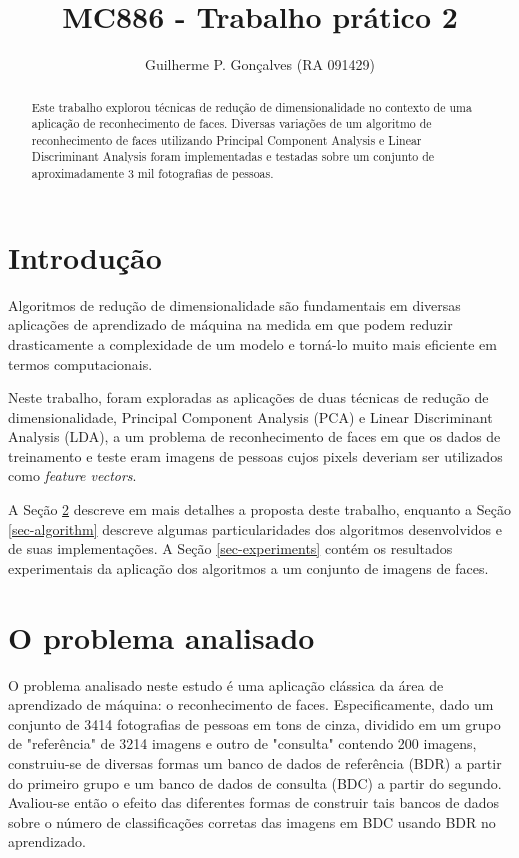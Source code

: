 \documentclass[10pt,twocolumn,letterpaper]{article}
\begin{document}
\title{MC886 - Trabalho prático 2}
\author{Guilherme P. Gonçalves (RA 091429)}

\maketitle
\begin{abstract}
Este trabalho explorou técnicas de redução de dimensionalidade no contexto de uma aplicação de reconhecimento de faces. Diversas variações de um algoritmo de reconhecimento de faces utilizando Principal Component Analysis e Linear Discriminant Analysis foram implementadas e testadas sobre um conjunto de aproximadamente 3 mil fotografias de pessoas.
\end{abstract}

\section{Introdução}

Algoritmos de redução de dimensionalidade são fundamentais em diversas aplicações de aprendizado de máquina na medida em que podem reduzir drasticamente a complexidade de um modelo e torná-lo muito mais eficiente em termos computacionais.

Neste trabalho, foram exploradas as aplicações de duas técnicas de redução de dimensionalidade, Principal Component Analysis (PCA) e Linear Discriminant Analysis (LDA), a um problema de reconhecimento de faces em que os dados de treinamento e teste eram imagens de pessoas cujos pixels deveriam ser utilizados como \emph{feature vectors}.

A Seção \ref{sec-problem} descreve em mais detalhes a proposta deste trabalho, enquanto a Seção \ref{sec-algorithm} descreve algumas particularidades dos algoritmos desenvolvidos e de suas implementações. A Seção \ref{sec-experiments} contém os resultados experimentais da aplicação dos algoritmos a um conjunto de imagens de faces.

\section{O problema analisado}
\label{sec-problem}

O problema analisado neste estudo é uma aplicação clássica da área de aprendizado de máquina: o reconhecimento de faces. Especificamente, dado um conjunto de 3414 fotografias de pessoas em tons de cinza, dividido em um grupo de "referência" de 3214 imagens e outro de "consulta" contendo 200 imagens, construiu-se de diversas formas um banco de dados de referência (BDR) a partir do primeiro grupo e um banco de dados de consulta (BDC) a partir do segundo. Avaliou-se então o efeito das diferentes formas de construir tais bancos de dados sobre o número de classificações corretas das imagens em BDC usando BDR no aprendizado.
\end{document}
